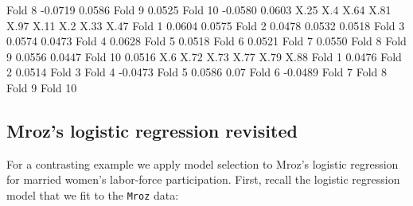 \documentclass[
]{jss}
\begin{document}
\begin{CodeChunk}
\begin{CodeOutput}
Fold 8  -0.0719                                          0.0586                
Fold 9                   0.0525                                                
Fold 10 -0.0580                                  0.0603                        
           X.25     X.4    X.64    X.81    X.97    X.11     X.2    X.33    X.47
Fold 1                                   0.0604          0.0575                
Fold 2   0.0478          0.0532  0.0518                                        
Fold 3                           0.0574                          0.0473        
Fold 4                   0.0628                                                
Fold 5   0.0518                                                                
Fold 6                                           0.0521                        
Fold 7           0.0550                                                        
Fold 8                                                                         
Fold 9                                   0.0556                          0.0447
Fold 10          0.0516                                                        
            X.6    X.72    X.73    X.77    X.79 X.88
Fold 1   0.0476                                     
Fold 2                   0.0514                     
Fold 3                                              
Fold 4                                  -0.0473     
Fold 5           0.0586                         0.07
Fold 6                          -0.0489             
Fold 7                                              
Fold 8                                              
Fold 9                                              
Fold 10                                             
\end{CodeOutput}
\end{CodeChunk}

\hypertarget{mrozs-logistic-regression-revisited}{%
\subsection{Mroz's logistic regression
revisited}\label{mrozs-logistic-regression-revisited}}

For a contrasting example we apply model selection to Mroz's logistic
regression for married women's labor-force participation. First, recall
the logistic regression model that we fit to the \texttt{Mroz} data:
\end{document}
